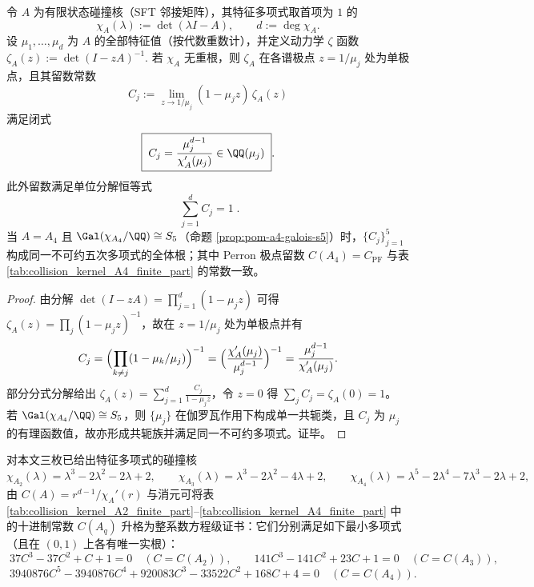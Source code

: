 \begin{proposition}\label{prop:pom-zeta-residue-constants-conjugates}
令 \(A\) 为有限状态碰撞核（SFT 邻接矩阵），其特征多项式取首项为 \(1\) 的
\[
\chi_A(\lambda):=\det(\lambda I-A),\qquad d:=\deg\chi_A.
\]
设 \(\mu_1,\dots,\mu_d\) 为 \(A\) 的全部特征值（按代数重数计），并定义动力学 \(\zeta\) 函数
\(
\zeta_A(z):=\det(I-zA)^{-1}.
\)
若 \(\chi_A\) 无重根，则 \(\zeta_A\) 在各谱极点 \(z=1/\mu_j\) 处为单极点，且其留数常数
\[
C_j:=\lim_{z\to 1/\mu_j}(1-\mu_j z)\,\zeta_A(z)
\]
满足闭式
\[
\boxed{\;
C_j=\frac{\mu_j^{d-1}}{\chi_A'(\mu_j)}\in \QQ(\mu_j)\; }.
\]
此外留数满足单位分解恒等式
\[
\boxed{\;\sum_{j=1}^{d} C_j=1\; }.
\]
当 \(A=A_4\) 且 \(\Gal(\chi_{A_4}/\QQ)\cong S_5\)（命题 \ref{prop:pom-a4-galois-s5}）时，\(\{C_j\}_{j=1}^5\) 构成同一不可约五次多项式的全体根；其中 Perron 极点留数 \(C(A_4)=C_{\mathrm{PF}}\) 与表 \ref{tab:collision_kernel_A4_finite_part} 的常数一致。
\end{proposition}
\begin{proof}
由分解 \(\det(I-zA)=\prod_{j=1}^{d}(1-\mu_j z)\) 可得
\(
\zeta_A(z)=\prod_{j}(1-\mu_j z)^{-1}
\)，故在 \(z=1/\mu_j\) 处为单极点并有
\[
C_j=\Bigl(\prod_{k\neq j}(1-\mu_k/\mu_j)\Bigr)^{-1}
=\Bigl(\frac{\chi_A'(\mu_j)}{\mu_j^{d-1}}\Bigr)^{-1}
=\frac{\mu_j^{d-1}}{\chi_A'(\mu_j)}.
\]
部分分式分解给出 \(\zeta_A(z)=\sum_{j=1}^{d}\frac{C_j}{1-\mu_j z}\)，令 \(z=0\) 得 \(\sum_j C_j=\zeta_A(0)=1\)。
若 \(\Gal(\chi_{A_4}/\QQ)\cong S_5\)，则 \(\{\mu_j\}\) 在伽罗瓦作用下构成单一共轭类，且 \(C_j\) 为 \(\mu_j\) 的有理函数值，故亦形成共轭族并满足同一不可约多项式。证毕。
\end{proof}

\begin{remark}[主极点留数的整系数方程级证书（\(A_2,A_3,A_4\)）]\label{rem:pom-residue-minpoly-a2a3a4}
对本文三枚已给出特征多项式的碰撞核
\[
\chi_{A_2}(\lambda)=\lambda^3-2\lambda^2-2\lambda+2,\qquad
\chi_{A_3}(\lambda)=\lambda^3-2\lambda^2-4\lambda+2,\qquad
\chi_{A_4}(\lambda)=\lambda^5-2\lambda^4-7\lambda^3-2\lambda+2,
\]
由 \(C(A)=r^{d-1}/\chi_A'(r)\) 与消元可将表 \ref{tab:collision_kernel_A2_finite_part}--\ref{tab:collision_kernel_A4_finite_part} 中的十进制常数 \(C(A_q)\) 升格为整系数方程级证书：它们分别满足如下最小多项式（且在 \((0,1)\) 上各有唯一实根）：
\[
\boxed{\;
37C^3-37C^2+C+1=0\quad(C=C(A_2)),\qquad
141C^3-141C^2+23C+1=0\quad(C=C(A_3)),}
\]
\[
\boxed{\;
3940876C^5-3940876C^4+920083C^3-33522C^2+168C+4=0\quad(C=C(A_4)).}
\]
\end{remark}

